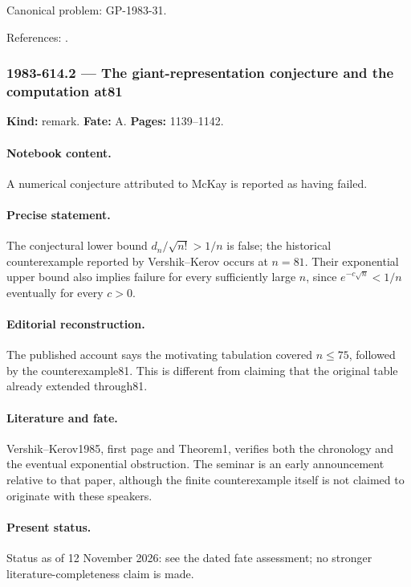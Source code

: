 \noindent Canonical problem: GP-1983-31.\par

\noindent References: \citep{vershikkerov1985dimensions,aggarwalelboim2026maximal}.\par

\subsubsection{1983-614.2 --- The giant-representation conjecture and the computation at81}

\label{item:1983-614.2}

\noindent\textbf{Kind:} remark. \textbf{Fate:} A. \textbf{Pages:} 1139--1142.\par

\paragraph{Notebook content.} A numerical conjecture attributed to McKay is reported as having failed.

\paragraph{Precise statement.} The conjectural lower bound $d_n/\sqrt{n!}>1/n$ is false; the historical counterexample reported by Vershik--Kerov occurs at $n=81$. Their exponential upper bound also implies failure for every sufficiently large $n$, since $e^{-c\sqrt n}<1/n$ eventually for every $c>0$.

\paragraph{Editorial reconstruction.} The published account says the motivating tabulation covered $n\le75$, followed by the counterexample81. This is different from claiming that the original table already extended through81.

\paragraph{Literature and fate.} Vershik--Kerov1985, first page and Theorem1, verifies both the chronology and the eventual exponential obstruction. The seminar is an early announcement relative to that paper, although the finite counterexample itself is not claimed to originate with these speakers.

\paragraph{Present status.} Status as of 12 November 2026: see the dated fate assessment; no stronger literature-completeness claim is made.

